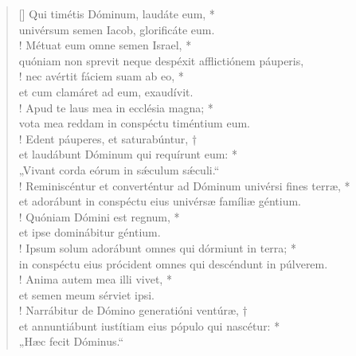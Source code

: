 \begin{verse}[\versewidth]
Qui timétis Dóminum, laudáte eum, *\\
univérsum semen Iacob, glorificáte eum.\\!
\vin Métuat eum omne semen Israel, *\\
\vin quóniam non sprevit neque despéxit afflictiónem páuperis,\\!
nec avértit fáciem suam ab eo, *\\
et cum clamáret ad eum, exaudívit.\\!
\vin Apud te laus mea in ecclésia magna; *\\
\vin vota mea reddam in conspéctu timéntium eum.\\!
Edent páuperes, et saturabúntur, †\\
et laudábunt Dóminum qui requírunt eum: *\\
„Vivant corda eórum in s\'{æ}culum s\'{æ}culi.“\\!
\vin Reminiscéntur et converténtur \verselinebreak ad Dóminum univérsi fines terræ, *\\
\vin et adorábunt in conspéctu eius univérsæ famíliæ géntium.\\!
Quóniam Dómini est regnum, *\\
et ipse dominábitur géntium.\\!
\vin Ipsum solum adorábunt omnes qui dórmiunt in terra; *\\
\vin in conspéctu eius prócident omnes qui descéndunt in púlverem.\\!
Anima autem mea illi vivet, *\\
et semen meum sérviet ipsi.\\!
\vin Narrábitur de Dómino generatióni ventúræ, †\\
\vin et annuntiábunt iustítiam eius pópulo qui nascétur: *\\
\vin „Hæc fecit Dóminus.“\\
\end{verse}
\vspace{1cm}


